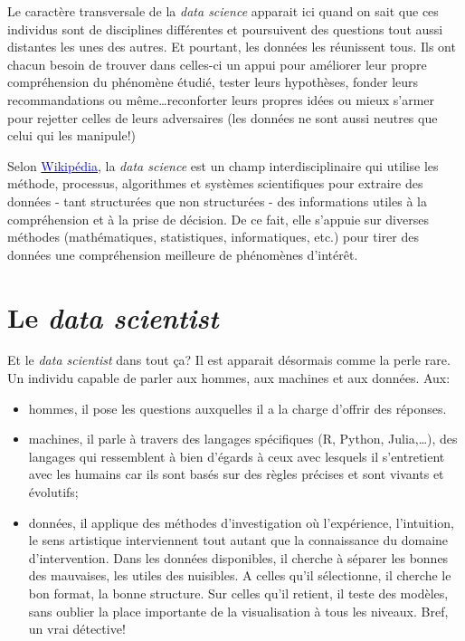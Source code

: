 \documentclass[]{book}
\begin{document}
Le caractère transversale de la \emph{data science} apparait ici quand
on sait que ces individus sont de disciplines différentes et poursuivent
des questions tout aussi distantes les unes des autres. Et pourtant, les
données les réunissent tous. Ils ont chacun besoin de trouver dans
celles-ci un appui pour améliorer leur propre compréhension du phénomène
étudié, tester leurs hypothèses, fonder leurs recommandations ou
même\ldots{}reconforter leurs propres idées ou mieux s'armer pour
rejetter celles de leurs adversaires (les données ne sont aussi neutres
que celui qui les manipule!)

Selon
\href{https://en.wikipedia.org/wiki/Data_science}{\textcolor{blue}{Wikipédia}},
la \emph{data science} est un champ interdisciplinaire qui utilise les
méthode, processus, algorithmes et systèmes scientifiques pour extraire
des données - tant structurées que non structurées - des informations
utiles à la compréhension et à la prise de décision. De ce fait, elle
s'appuie sur diverses méthodes (mathématiques, statistiques,
informatiques, etc.) pour tirer des données une compréhension meilleure
de phénomènes d'intérêt.

\section{\texorpdfstring{Le \emph{data
scientist}}{Le data scientist}}\label{le-data-scientist}

Et le \emph{data scientist} dans tout ça? Il est apparait désormais
comme la perle rare. Un individu capable de parler aux hommes, aux
machines et aux données. Aux:

\begin{itemize}
\item
  hommes, il pose les questions auxquelles il a la charge d'offrir des
  réponses.
\item
  machines, il parle à travers des langages spécifiques (R, Python,
  Julia,\ldots{}), des langages qui ressemblent à bien d'égards à ceux
  avec lesquels il s'entretient avec les humains car ils sont basés sur
  des règles précises et sont vivants et évolutifs;
\item
  données, il applique des méthodes d'investigation où l'expérience,
  l'intuition, le sens artistique interviennent tout autant que la
  connaissance du domaine d'intervention. Dans les données disponibles,
  il cherche à séparer les bonnes des mauvaises, les utiles des
  nuisibles. A celles qu'il sélectionne, il cherche le bon format, la
  bonne structure. Sur celles qu'il retient, il teste des modèles, sans
  oublier la place importante de la visualisation à tous les niveaux.
  Bref, un vrai détective!
\end{itemize}
\end{document}
